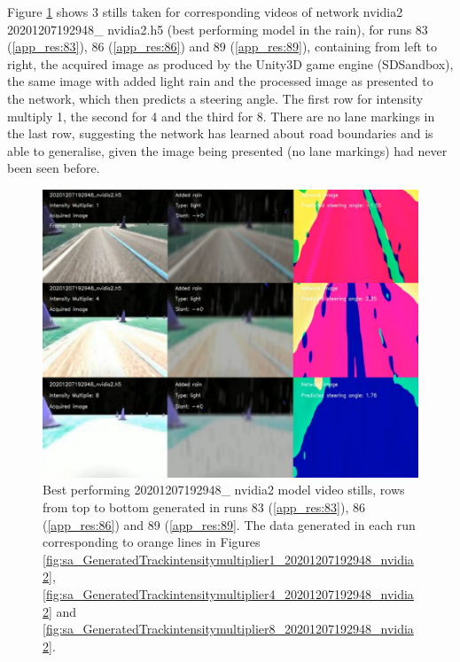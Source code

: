 Figure \ref{fig:20201207192948_nvidia2_mult_1_4_8_light} shows 3 stills taken for corresponding videos of network nvidia2 20201207192948\_ nvidia2.h5 (best performing model in the rain), for runs 83 (\ref{app_res:83}), 86 (\ref{app_res:86}) and 89 (\ref{app_res:89}), containing from left to right, the acquired image as produced by the Unity3D game engine (SDSandbox), the same image with added light rain and the processed image as presented to the network, which then predicts a steering angle. The first row for intensity multiply 1, the second for 4 and the third for 8. There are no lane markings in the last row, suggesting the network has learned about road boundaries and is able to generalise, given the image being presented (no lane markings) had never been seen before.

\begin{figure}[h!]
 \centering 
 \includegraphics[width=\textwidth]{Figures/20201207192948_nvidia2_mult_1_4_8_light.png}
 \caption{Best performing 20201207192948\_ nvidia2 model video stills, rows from top to bottom generated in runs 83 (\ref{app_res:83}), 86 (\ref{app_res:86}) and 89 (\ref{app_res:89}. The data generated in each run corresponding to orange lines in Figures \ref{fig:sa_GeneratedTrackintensitymultiplier1_20201207192948_nvidia2}, 
\ref{fig:sa_GeneratedTrackintensitymultiplier4_20201207192948_nvidia2} and 
\ref{fig:sa_GeneratedTrackintensitymultiplier8_20201207192948_nvidia2}.}
 \label{fig:20201207192948_nvidia2_mult_1_4_8_light}
\end{figure}


